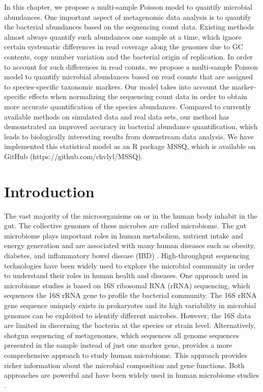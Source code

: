  \label{chpt3:MSSQ}

In this chapter, we propose a multi-sample Poisson model to quantify microbial abundances. One important aspect of metagenomic data analysis is to quantify the bacterial abundances based on the sequencing count data. Existing methods almost always quantify such abundances one sample at a time, which ignore certain systematic differences in read coverage along the genomes due to GC contents, copy number variation and the bacterial origin of replication. In order to account for such differences in read counts, we propose a multi-sample Poisson model to quantify microbial abundances based on read counts that are assigned to species-specific taxonomic markers. Our model takes into account the marker-specific effects when normalizing the sequencing count data in order to obtain more accurate quantification of the species abundances. Compared to currently available methods on simulated data and real data sets, our method has demonstrated an improved accuracy in bacterial abundance quantification, which leads to biologically interesting results from downstream data analysis. We have implemented this statistical model as an R package MSSQ, which is available on GitHub (https://github.com/chvlyl/MSSQ).


\section{Introduction}
The vast majority of the microorganisms on or in the human body inhabit in the gut. The collective genomes of these microbes are called microbiome. The gut microbiome plays important roles in human metabolism, nutrient intake and energy generation and are associated with many human diseases such as obesity, diabetes, and inflammatory bowel disease (IBD) \citep{Cox:2014hy, lewis2015inflammation, Cho:2012cn}. High-throughput sequencing technologies have been widely used to explore the microbial community in order to understand their roles in human health and diseases. One approach used in microbiome studies is based on 16S ribosomal RNA (rRNA) sequencing, which sequences the 16S rRNA gene to profile the bacterial community. The 16S rRNA gene sequence uniquely exists in prokaryotes and its high variability in microbial genomes can be exploited to identify different microbes. However, the 16S data are limited in discerning the bacteria at the species or strain level. Alternatively, shotgun sequencing of metagenomes, which sequences all genome sequences presented in the sample instead of just one marker gene, provides a more comprehensive approach to study human microbiome. This approach provides richer information about the microbial composition and gene functions. Both approaches are powerful and have been widely used in human microbiome studies \citep{turnbaugh2007human, qin2010human}.

